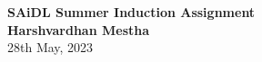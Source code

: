 \begin{titlepage}
    \begin{center}
    {\fontsize{40}{48}\selectfont \bfseries SAiDL Summer Induction Assignment} 
    \\\vspace{20pt}
    \vspace{20pt}
    \textbf{Harshvardhan Mestha}
    \vspace{8pt}
    \\ 28th May, 2023
    \end{center}
\end{titlepage}